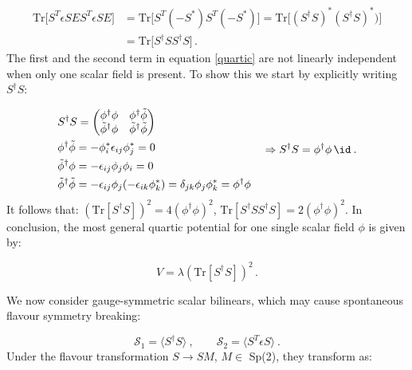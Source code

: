 \begin{equation}
\begin{split}
\mathrm{Tr} \bigl[ S^T \epsilon S E S^T \epsilon S E\bigr]  & = \mathrm{Tr} \bigl[ S^T (-S^*) S^T (-S^*) \bigr] = \mathrm{Tr} \bigl[ (S^{\dagger} S)^* (S^{\dagger} S)^*) \bigr] \\
& =\mathrm{Tr} \bigl[ S^{\dagger} S S^{\dagger} S\bigr] \, .
\end{split}
\label{proof2}
\end{equation}
%
The first and the second term in equation \ref{quartic} are not linearly independent when only one scalar field is present. To show this we start by explicitly writing $S^{\dagger} S$:

\begin{equation}
\begin{split}
& S^{\dagger} S = 
\begin{pmatrix}
\phi^{\dagger}\phi  & \phi^{\dagger} \tilde{\phi} \\
\tilde{\phi}^{\dagger} \phi & \tilde{\phi}^{\dagger} \tilde{\phi} \\
\end{pmatrix} \\
& \phi^{\dagger} \tilde{\phi} = - \phi^*_i \epsilon_{ij} \phi^*_j = 0 \\
& \tilde{\phi}^{\dagger} \phi = - \epsilon_{ij} \phi_j\phi_i = 0 \\
& \tilde{\phi}^{\dagger} \tilde{\phi} = - \epsilon_{ij} \phi_j (- \epsilon_{ik} \phi^*_k) = \delta_{jk} \phi_j \phi^*_k = \phi^{\dagger} \phi \\
\end{split}
\quad \Rightarrow  S^{\dagger} S = \phi^{\dagger} \phi \, \id \: .
\label{app_S1}
\end{equation}
%
It follows that: $(\mathrm{Tr} [S^{\dagger} S])^2 = 4 (\phi^{\dagger} \phi)^2$, $\mathrm{Tr}[S^{\dagger} S S^{\dagger} S]= 2 (\phi^{\dagger} \phi)^2$.
In conclusion, the most general quartic potential for one single scalar field $\phi$ is given by:

\begin{equation}
V = \lambda (\mathrm{Tr} [S^{\dagger} S])^2  \, .
\end{equation}

We now consider gauge-symmetric scalar bilinears, which may cause spontaneous flavour symmetry breaking:

\begin{equation}
\mathcal{S}_1 = \langle S^{\dagger} S \rangle \: , \qquad \mathcal{S}_2 = \langle S^T \epsilon S \rangle \: .
\end{equation}
%
Under the flavour transformation $S \to SM$, $M \in$ Sp(2), they transform as:

